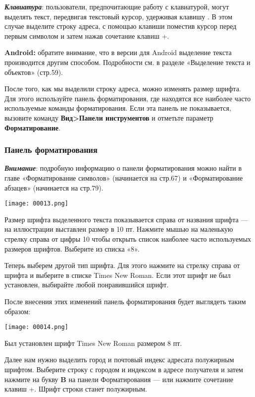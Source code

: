 \documentclass[a4paper,10pt]{article}
\begin{document}
\textbf{\textit{Клавиатура}}: пользователи, предпочитающие работу с клавиатурой, могут выделять текст, передвигая текстовый курсор, удерживая клавишу . В этом случае выделите строку адреса, с помощью клавиши  поместив курсор перед первым символом и затем нажав сочетание клавиш +\keys{\arrowkeydown}.

\begin{mdframed}[backgroundcolor=blue!10]
\textbf{Android:} обратите внимание, что в версии для Android выделение текста производится другим способом. Подробности см. в разделе «Выделение текста и объектов» (стр.59).
\end{mdframed}

После того, как мы выделили строку адреса, можно изменять размер шрифта. Для этого используйте панель форматирования, где находятся все наиболее часто используемые команды форматирования. Если эта панель не показывается, вызовите команду \textbf{Вид>Панели инструментов} и отметьте параметр \textbf{Форматирование}.

\subsubsection{Панель форматирования}
\textbf{\textit{Внимание}}: подробную информацию о панели форматирования можно найти в главе «Форматирование символов» (начинается на стр.67) и «Форматирование абзацев» (начинается на стр.79).

\texttt{[image: 00013.png]}

Размер шрифта выделенного текста показывается справа от названия шрифта --- на иллюстрации выставлен размер в 10 пт. Нажмите мышью на маленькую стрелку справа от цифры 10 чтобы открыть список наиболее часто используемых  размеров шрифтов. Выберите из списка «8».

Теперь выберем другой тип шрифта. Для этого нажмите на стрелку справа от шрифта и выберите в списке Times New Roman. Если этот шрифт не был установлен, выбирайте любой понравившийся шрифт.

После внесения этих изменений панель форматирования будет выглядеть таким образом:

\texttt{[image: 00014.png]}

Был установлен шрифт Times New Roman размером 8 пт.

Далее нам нужно выделить город и почтовый индекс адресата полужирным шрифтом. Выберите строку с городом и индексом в адресе получателя и затем нажмите на букву \textbf{B} на панели Форматирования --- или нажмите сочетание клавиш +. Шрифт строки станет полужирным.
\end{document}
